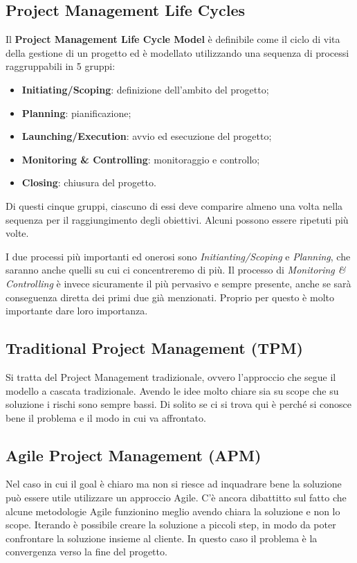 \subsection{Project Management Life Cycles}
Il \textbf{Project Management Life Cycle Model} è definibile come il ciclo di vita della gestione di un progetto ed è modellato utilizzando una sequenza di processi raggruppabili in 5 gruppi:
\begin{itemize}
	\item \textbf{Initiating/Scoping}: definizione dell'ambito del progetto;
	\item \textbf{Planning}: pianificazione;
	\item \textbf{Launching/Execution}: avvio ed esecuzione del progetto;
	\item \textbf{Monitoring \& Controlling}: monitoraggio e controllo;
	\item \textbf{Closing}: chiusura del progetto.
\end{itemize}
Di questi cinque gruppi, ciascuno di essi deve comparire almeno una volta nella sequenza per il raggiungimento degli obiettivi. Alcuni possono essere ripetuti più volte.
\begin{info}
	I due processi più importanti ed onerosi sono \textit{Initianting/Scoping} e \textit{Planning}, che saranno anche quelli su cui ci concentreremo di più. Il processo di \textit{Monitoring \& Controlling} è invece sicuramente il più pervasivo e sempre presente, anche se sarà conseguenza diretta dei primi due già menzionati. Proprio per questo è molto importante dare loro importanza.
\end{info}
\subsection{Traditional Project Management (TPM)}
Si tratta del Project Management tradizionale, ovvero l'approccio che segue il modello a cascata tradizionale. Avendo le idee molto chiare sia su scope che su soluzione i rischi sono sempre bassi. Di solito se ci si trova qui è perché si conosce bene il problema e il modo in cui va affrontato.
\subsection{Agile Project Management (APM)}
Nel caso in cui il goal è chiaro ma non si riesce ad inquadrare bene la soluzione può essere utile utilizzare un approccio Agile. C'è ancora dibattitto sul fatto che alcune metodologie Agile funzionino meglio avendo chiara la soluzione e non lo scope. Iterando è possibile creare la soluzione a piccoli step, in modo da poter confrontare la soluzione insieme al cliente. In questo caso il problema è la convergenza verso la fine del progetto.
